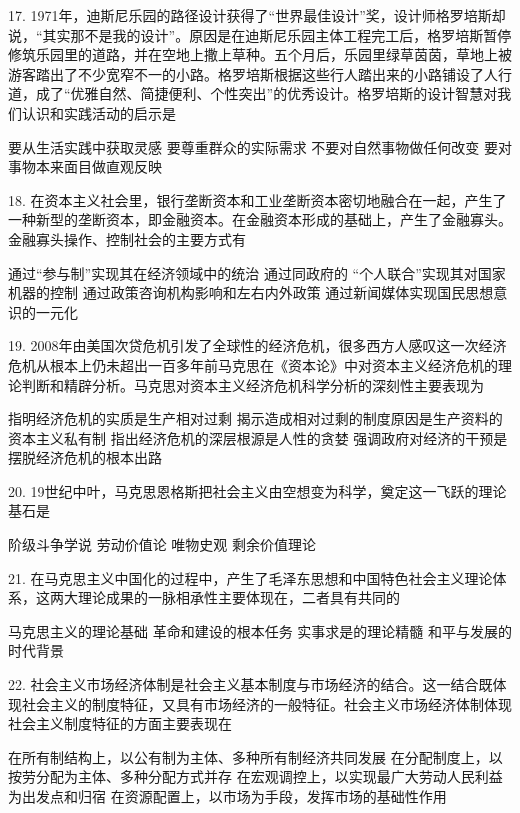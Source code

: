 17. 1971年，迪斯尼乐园的路径设计获得了“世界最佳设计”奖，设计师格罗培斯却说，“其实那不是我的设计”。原因是在迪斯尼乐园主体工程完工后，格罗培斯暂停修筑乐园里的道路，并在空地上撒上草种。五个月后，乐园里绿草茵茵，草地上被游客踏出了不少宽窄不一的小路。格罗培斯根据这些行人踏出来的小路铺设了人行道，成了“优雅自然、简捷便利、个性突出”的优秀设计。格罗培斯的设计智慧对我们认识和实践活动的启示是
\begin{choices}
	 要从生活实践中获取灵感
	 要尊重群众的实际需求
	 不要对自然事物做任何改变
	 要对事物本来面目做直观反映
\end{choices}
18. 在资本主义社会里，银行垄断资本和工业垄断资本密切地融合在一起，产生了一种新型的垄断资本，即金融资本。在金融资本形成的基础上，产生了金融寡头。
金融寡头操作、控制社会的主要方式有
\begin{choices}
	 通过“参与制”实现其在经济领域中的统治
	 通过同政府的 “个人联合”实现其对国家机器的控制
	 通过政策咨询机构影响和左右内外政策
	 通过新闻媒体实现国民思想意识的一元化
\end{choices}
19. 2008年由美国次贷危机引发了全球性的经济危机，很多西方人感叹这一次经济危机从根本上仍未超出一百多年前马克思在《资本论》中对资本主义经济危机的理论判断和精辟分析。马克思对资本主义经济危机科学分析的深刻性主要表现为
\begin{choices}
	 指明经济危机的实质是生产相对过剩
	 揭示造成相对过剩的制度原因是生产资料的资本主义私有制
	 指出经济危机的深层根源是人性的贪婪
	 强调政府对经济的干预是摆脱经济危机的根本出路
\end{choices}
20. 19世纪中叶，马克思恩格斯把社会主义由空想变为科学，奠定这一飞跃的理论基石是
\begin{choices}
	 阶级斗争学说
	 劳动价值论
	 唯物史观
	 剩余价值理论
\end{choices}
21. 在马克思主义中国化的过程中，产生了毛泽东思想和中国特色社会主义理论体系，这两大理论成果的一脉相承性主要体现在，二者具有共同的
\begin{choices}
	 马克思主义的理论基础
	 革命和建设的根本任务
	 实事求是的理论精髓
	 和平与发展的时代背景
\end{choices}
22. 社会主义市场经济体制是社会主义基本制度与市场经济的结合。这一结合既体现社会主义的制度特征，又具有市场经济的一般特征。社会主义市场经济体制体现社会主义制度特征的方面主要表现在
\begin{choices}
	 在所有制结构上，以公有制为主体、多种所有制经济共同发展
	 在分配制度上，以按劳分配为主体、多种分配方式并存
	 在宏观调控上，以实现最广大劳动人民利益为出发点和归宿
	 在资源配置上，以市场为手段，发挥市场的基础性作用
\end{choices}
